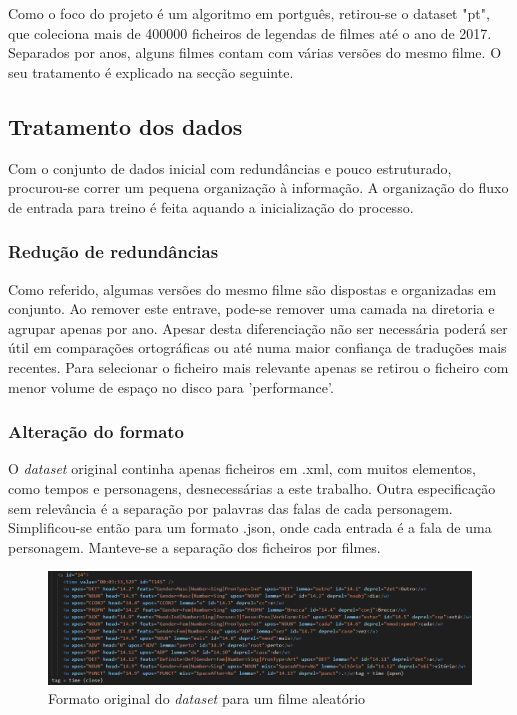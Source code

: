 \documentclass{article}
\begin{document}
Como o foco do projeto é um algoritmo em portguês, retirou-se o dataset "pt", que coleciona mais de 400000 ficheiros de legendas de filmes até o ano de 2017. Separados por anos, alguns filmes contam com várias versões do mesmo filme. O seu tratamento é explicado na secção seguinte. 

\subsection{Tratamento dos dados}
Com o conjunto de dados inicial com redundâncias e pouco estruturado, procurou-se correr um pequena organização à informação. A organização do fluxo de entrada para treino é feita aquando a inicialização do processo.

\subsubsection{Redução de redundâncias}
Como referido, algumas versões do mesmo filme são dispostas e organizadas em conjunto. Ao remover este entrave, pode-se remover uma camada na diretoria e agrupar apenas por ano. Apesar desta diferenciação não ser necessária poderá ser útil em comparações ortográficas ou até numa maior confiança de traduções mais recentes. Para selecionar o ficheiro mais relevante apenas se retirou o ficheiro com menor volume de espaço no disco para 'performance'.

\subsubsection{Alteração do formato}
O \textit{dataset} original continha apenas ficheiros em .xml, com muitos elementos, como tempos e personagens, desnecessárias a este trabalho. Outra especificação sem relevância é a separação por palavras das falas de cada personagem. Simplificou-se então para um formato .json, onde cada entrada é a fala de uma personagem. Manteve-se a separação dos ficheiros por filmes.

\begin{figure}
	\centering
    \includegraphics[scale=0.3]{xml.png}
    \caption{Formato original do \textit{dataset} para um filme aleatório}
    \label{xmlimg}
\end{figure}
\end{document}

